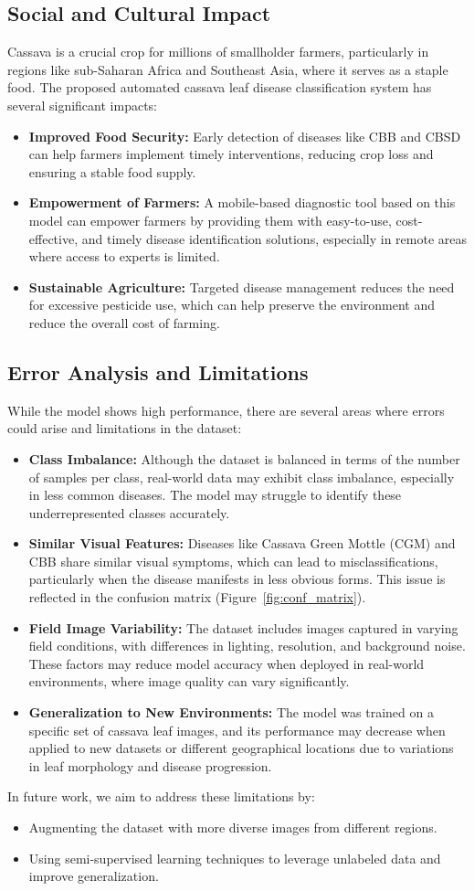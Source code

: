 \subsection{Social and Cultural Impact}
Cassava is a crucial crop for millions of smallholder farmers, particularly in regions like sub-Saharan Africa and Southeast Asia, where it serves as a staple food. The proposed automated cassava leaf disease classification system has several significant impacts:
\begin{itemize}
  \item \textbf{Improved Food Security:} Early detection of diseases like CBB and CBSD can help farmers implement timely interventions, reducing crop loss and ensuring a stable food supply.
  \item \textbf{Empowerment of Farmers:} A mobile-based diagnostic tool based on this model can empower farmers by providing them with easy-to-use, cost-effective, and timely disease identification solutions, especially in remote areas where access to experts is limited.
  \item \textbf{Sustainable Agriculture:} Targeted disease management reduces the need for excessive pesticide use, which can help preserve the environment and reduce the overall cost of farming.
\end{itemize}

\subsection{Error Analysis and Limitations}
While the model shows high performance, there are several areas where errors could arise and limitations in the dataset:
\begin{itemize}
  \item \textbf{Class Imbalance:} Although the dataset is balanced in terms of the number of samples per class, real-world data may exhibit class imbalance, especially in less common diseases. The model may struggle to identify these underrepresented classes accurately.
  \item \textbf{Similar Visual Features:} Diseases like Cassava Green Mottle (CGM) and CBB share similar visual symptoms, which can lead to misclassifications, particularly when the disease manifests in less obvious forms. This issue is reflected in the confusion matrix (Figure~\ref{fig:conf_matrix}).
  \item \textbf{Field Image Variability:} The dataset includes images captured in varying field conditions, with differences in lighting, resolution, and background noise. These factors may reduce model accuracy when deployed in real-world environments, where image quality can vary significantly.
  \item \textbf{Generalization to New Environments:} The model was trained on a specific set of cassava leaf images, and its performance may decrease when applied to new datasets or different geographical locations due to variations in leaf morphology and disease progression.
\end{itemize}

In future work, we aim to address these limitations by:
\begin{itemize}
  \item Augmenting the dataset with more diverse images from different regions.
  \item Using semi-supervised learning techniques to leverage unlabeled data and improve generalization.
\end{itemize}